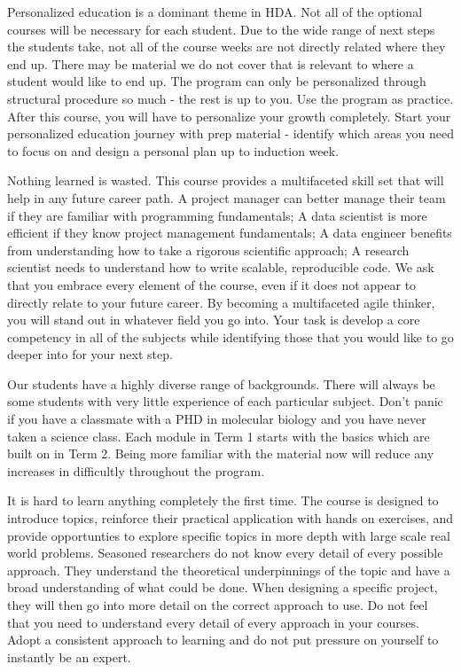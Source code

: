 \documentclass[
]{book}
\begin{document}
Personalized education is a dominant theme in HDA. Not all of the optional courses will be necessary for each student. Due to the wide range of next steps the students take, not all of the course weeks are not directly related where they end up. There may be material we do not cover that is relevant to where a student would like to end up. The program can only be personalized through structural procedure so much - the rest is up to you. Use the program as practice. After this course, you will have to personalize your growth completely. Start your personalized education journey with prep material - identify which areas you need to focus on and design a personal plan up to induction week.

Nothing learned is wasted. This course provides a multifaceted skill set that will help in any future career path. A project manager can better manage their team if they are familiar with programming fundamentals; A data scientist is more efficient if they know project management fundamentals; A data engineer benefits from understanding how to take a rigorous scientific approach; A research scientist needs to understand how to write scalable, reproducible code. We ask that you embrace every element of the course, even if it does not appear to directly relate to your future career. By becoming a multifaceted agile thinker, you will stand out in whatever field you go into. Your task is develop a core competency in all of the subjects while identifying those that you would like to go deeper into for your next step.

Our students have a highly diverse range of backgrounds. There will always be some students with very little experience of each particular subject. Don't panic if you have a classmate with a PHD in molecular biology and you have never taken a science class. Each module in Term 1 starts with the basics which are built on in Term 2. Being more familiar with the material now will reduce any increases in difficultly throughout the program.

It is hard to learn anything completely the first time. The course is designed to introduce topics, reinforce their practical application with hands on exercises, and provide opportunties to explore specific topics in more depth with large scale real world problems. Seasoned researchers do not know every detail of every possible approach. They understand the theoretical underpinnings of the topic and have a broad understanding of what could be done. When designing a specific project, they will then go into more detail on the correct approach to use. Do not feel that you need to understand every detail of every approach in your courses. Adopt a consistent approach to learning and do not put pressure on yourself to instantly be an expert.
\end{document}
